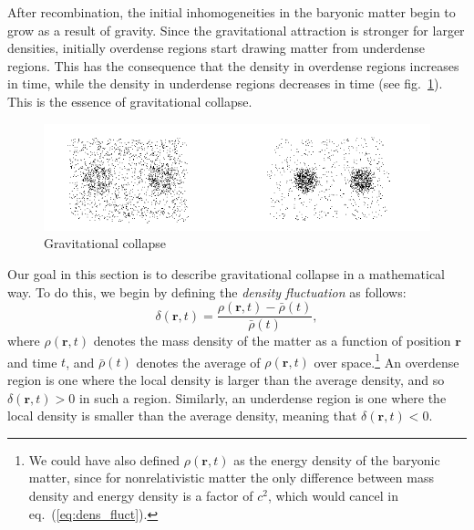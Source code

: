 After recombination, the initial inhomogeneities in the baryonic matter begin to grow as a result of gravity. Since the gravitational attraction is stronger for larger densities, initially overdense regions start drawing matter from underdense regions. This has the consequence that the density in overdense regions increases in time, while the density in underdense regions decreases in time (see fig.\ \ref{fig:lec8_3}). This is the essence of gravitational collapse.
\begin{figure}[ht]
\begin{center}
\includegraphics[scale=0.8]{Draw/lec8_3.png}
\end{center}
\caption{Gravitational collapse}
\label{fig:lec8_3}
\end{figure}

Our goal in this section is to describe gravitational collapse in a mathematical way. To do this, we begin by defining the {\it density fluctuation} as follows:
\begin{equation} \label{eq:dens_fluct}
\delta(\mathbf{r},t)=\frac{\rho(\mathbf{r},t)-\bar{\rho}(t)}{\bar{\rho}(t)},
\end{equation}
where $\rho(\mathbf{r},t)$ denotes the mass density of the matter as a function of position $\mathbf{r}$ and time $t$, and $\bar{\rho}(t)$ denotes the average of $\rho(\mathbf{r},t)$ over space.\footnote{We could have also defined $\rho(\mathbf{r},t)$ as the energy density of the baryonic matter, since for nonrelativistic matter the only difference between mass density and energy density is a factor of $c^2$, which would cancel in eq.\ (\ref{eq:dens_fluct}).} An overdense region is one where the local density is larger than the average density, and so $\delta(\mathbf{r},t)>0$ in such a region. Similarly, an underdense region is one where the local density is smaller than the average density, meaning that $\delta(\mathbf{r},t)<0$.

